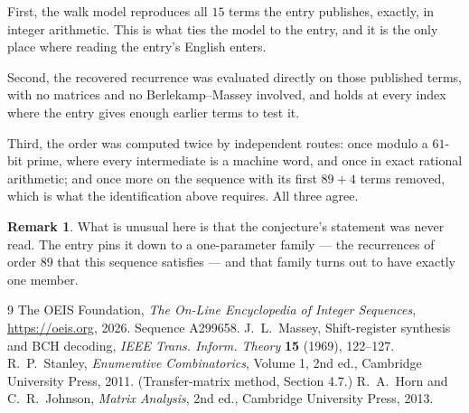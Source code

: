 \documentclass[11pt,a4paper]{article}
\theoremstyle{plain}
\theoremstyle{definition}
\newtheorem{remark}[theorem]{Remark}
\begin{document}
First, the walk model reproduces all $15$ terms the entry publishes, exactly, in integer
arithmetic. This is what ties the model to the entry, and it is the only place where reading
the entry's English enters.

Second, the recovered recurrence was evaluated directly on those published terms, with no
matrices and no Berlekamp--Massey involved, and holds at every index where the entry gives
enough earlier terms to test it.

Third, the order was computed twice by independent routes: once modulo a $61$-bit prime, where
every intermediate is a machine word, and once in exact rational arithmetic; and once more on
the sequence with its first $89+4$ terms removed, which is what the identification above
requires. All three agree.

\begin{remark}
What is unusual here is that the conjecture's statement was never read. The entry pins it down
to a one-parameter family --- the recurrences of order $89$ that this sequence satisfies
--- and that family turns out to have exactly one member.
\end{remark}

\begin{thebibliography}{9}
 The OEIS Foundation, \emph{The On-Line Encyclopedia of Integer
Sequences}, \url{https://oeis.org}, 2026. Sequence A299658.
 J.~L.~Massey, Shift-register synthesis and BCH decoding, \emph{IEEE
Trans. Inform. Theory} \textbf{15} (1969), 122--127.
 R.~P.~Stanley, \emph{Enumerative Combinatorics}, Volume 1, 2nd ed.,
Cambridge University Press, 2011. (Transfer-matrix method, Section 4.7.)
 R.~A.~Horn and C.~R.~Johnson, \emph{Matrix Analysis}, 2nd ed., Cambridge
University Press, 2013.
\end{thebibliography}
\end{document}
